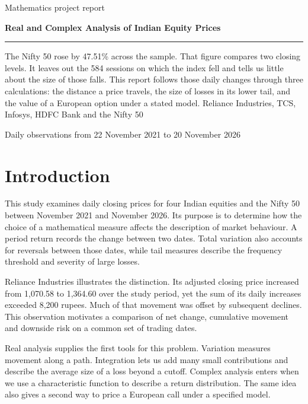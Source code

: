 \documentclass[12pt,a4paper]{article}
\newcommand{\chapterpage}[1]{\clearpage\section{#1}}
\begin{document}
\thispagestyle{empty}
\vspace*{16mm}
{\color{ink}\large Mathematics project report}\par\vspace{9mm}
{\Huge\bfseries Real and Complex Analysis of Indian Equity Prices\par}
\vspace{4mm}{\Large Price variation, tail risk and option valuation}\par\vspace{5mm}
\textcolor{ink}{\rule{\linewidth}{1.1pt}}
\bigskip
The Nifty 50 rose by 47.51\% across the sample. That figure compares two closing levels. It leaves out the 584 sessions on which the index fell and tells us little about the size of those falls. This report follows those daily changes through three calculations: the distance a price travels, the size of losses in its lower tail, and the value of a European option under a stated model.
\vfill
{\large Reliance Industries, TCS, Infosys, HDFC Bank and the Nifty 50}\par
Daily observations from 22 November 2021 to 20 November 2026\par
\clearpage
{\small\setlength{\parskip}{0pt}\tableofcontents}
\chapterpage{Introduction}
This study examines daily closing prices for four Indian equities and the Nifty 50 between November 2021 and November 2026. Its purpose is to determine how the choice of a mathematical measure affects the description of market behaviour. A period return records the change between two dates. Total variation also accounts for reversals between those dates, while tail measures describe the frequency threshold and severity of large losses.

Reliance Industries illustrates the distinction. Its adjusted closing price increased from 1,070.58 to 1,364.60 over the study period, yet the sum of its daily increases exceeded 8,200 rupees. Much of that movement was offset by subsequent declines. This observation motivates a comparison of net change, cumulative movement and downside risk on a common set of trading dates.

Real analysis supplies the first tools for this problem. Variation measures movement along a path. Integration lets us add many small contributions and describe the average size of a loss beyond a cutoff. Complex analysis enters when we use a characteristic function to describe a return distribution. The same idea also gives a second way to price a European call under a specified model.
 
\end{document}
